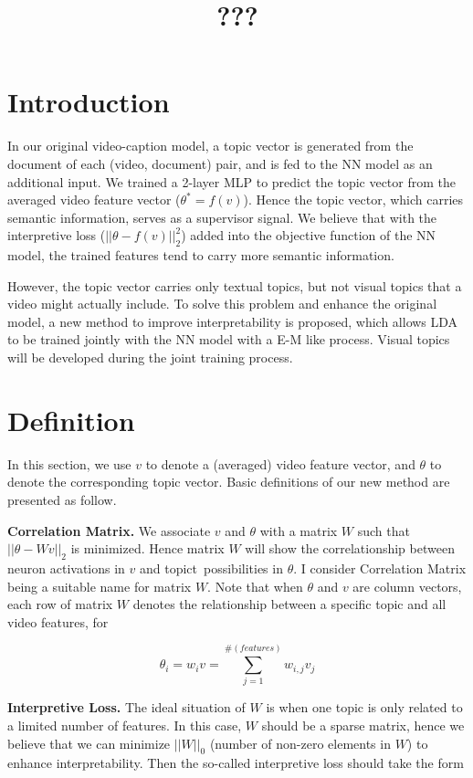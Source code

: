 \documentclass[12pt,a4paper]{ctexart}
\title{???}
\author{}
\begin{document}
	
\maketitle

\section{Introduction}

In our original video-caption model, a topic vector is generated from the document of each (video, document) pair, and is fed to the NN model as an additional input. We trained a 2-layer MLP to predict the topic vector from the averaged video feature vector ($\theta^* = f(v)$). Hence the topic vector, which carries semantic information, serves as a supervisor signal. We believe that with the interpretive loss ($||\theta - f(v)||_2^2$) added into the objective function of the NN model, the trained features tend to carry more semantic information.

However, the topic vector carries only textual topics, but not visual topics that a video might actually include. To solve this problem and enhance the original model, a new method to improve interpretability is proposed, which allows LDA to be trained jointly with the NN model with a E-M like process. Visual topics will be developed during the joint training process.

\section{Definition}

In this section, we use $v$ to denote a (averaged) video feature vector, and $\theta$ to denote the corresponding topic vector. Basic definitions of our new method are presented as follow.

\textbf{Correlation Matrix.} We associate $v$ and $\theta$ with a matrix $W$ such that $||\theta - Wv||_2$ is minimized. Hence matrix $W$ will show the correlationship between neuron activations in $v$ and topict\ possibilities in $\theta$. I consider Correlation Matrix being a suitable name for matrix $W$. Note that when $\theta$ and $v$ are column vectors, each row of matrix $W$ denotes the relationship between a specific topic and all video features, for 

$$ \theta_i = w_i v = \sum_{j=1}^{\#(features)}{w_{i,j}v_j}$$

\textbf{Interpretive Loss.} The ideal situation of $W$ is when one topic is only related to a limited number of features. In this case, $W$ should be a sparse matrix, hence we believe that we can minimize $||W||_0$ (number of non-zero elements in $W$) to enhance interpretability. Then the so-called interpretive loss should take the form
\end{document}
